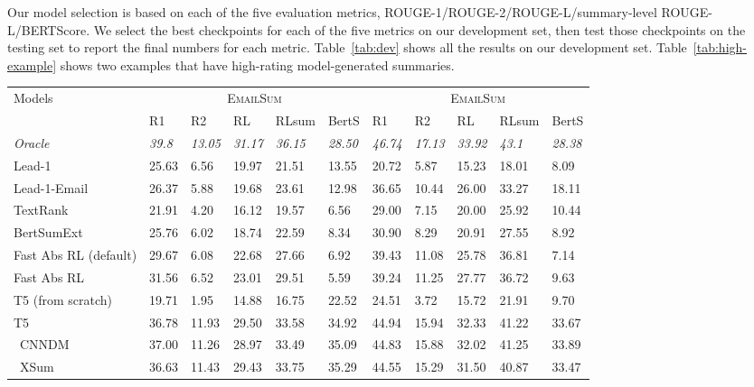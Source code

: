 Our model selection is based on each of the five evaluation metrics, ROUGE-1/ROUGE-2/ROUGE-L/summary-level ROUGE-L/BERTScore. We select the best checkpoints for each of the five metrics on our development set, then test those checkpoints on the testing set to report the final numbers for each metric. Table~\ref{tab:dev}
shows all the results on our development set. Table~\ref{tab:high-example} shows two examples that have high-rating model-generated summaries. 


\begin{savenotes}
\begin{table*}
\begin{center}
\small
\begin{tabular}{lllllllllll}
\toprule 
Models & \multicolumn{5}{c}{\textsc{EmailSum}} & \multicolumn{5}{c}{\textsc{EmailSum}} \\
 \cmidrule(lr){2-6} \cmidrule(lr){7-11}
& R1 & R2 & RL & RLsum & BertS & R1 & R2 & RL & RLsum & BertS \\
 \midrule
 \emph{Oracle} &  \emph{39.8} &  \emph{13.05} &  \emph{31.17} &  \emph{36.15} & \emph{28.50} &  \emph{46.74} &  \emph{17.13} &  \emph{33.92} &  \emph{43.1} & \emph{28.38}  \\
Lead-1 & 25.63  & 6.56 & 19.97 & 21.51 & 13.55 & 20.72 & 5.87 & 15.23 & 18.01 & 8.09 \\
Lead-1-Email & 26.37 & 5.88 & 19.68 & 23.61 & 12.98 & 36.65 & 10.44 & 26.00 & 33.27 & 18.11 \\
TextRank & 21.91 & 4.20 & 16.12 & 19.57 & 6.56 & 29.00 & 7.15 & 20.00 & 25.92 & 10.44 \\
BertSumExt & 25.76 & 6.02 & 18.74 & 22.59 & 8.34 & 30.90 & 8.29 & 20.91 & 27.55 & 8.92 \\
 \midrule
Fast Abs RL (default)  & 29.67 & 6.08 & 22.68 & 27.66 & 6.92 & 39.43 & 11.08 & 25.78 & 36.81 & 7.14 \\
Fast Abs RL  & 31.56 & 6.52 & 23.01 & 29.51 & 5.59 & 39.24 & 11.25 & 27.77 & 36.72 & 9.63 \\
T5 (from scratch) & 19.71 & 1.95 & 14.88 & 16.75 & 22.52 & 24.51 & 3.72 & 15.72 & 21.91 & 9.70 \\
T5 & 36.78 & 11.93 & 29.50 & 33.58 & 34.92 & 44.94 & 15.94 & 32.33 & 41.22 & 33.67 \\
\cmidrule(lr){1-1}
\ CNNDM & 37.00 & 11.26 & 28.97 & 33.49 & 35.09 & 44.83 & 15.88 & 32.02 & 41.25 & 33.89 \\
\ XSum & 36.63 & 11.43 & 29.43 & 33.75 & 35.29 & 44.55 & 15.29 & 31.50 & 40.87 & 33.47 \\

\end{tabular}
\end{center}
\end{table*}
\end{savenotes}
